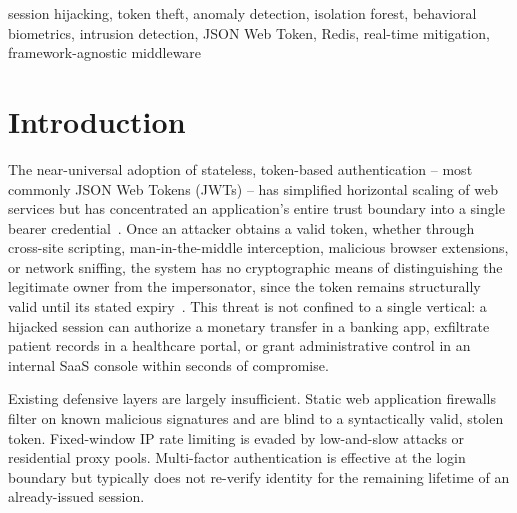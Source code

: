 \documentclass[conference]{IEEEtran}
\begin{document}
\begin{IEEEkeywords}
session hijacking, token theft, anomaly detection, isolation forest, behavioral biometrics, intrusion detection, JSON Web Token, Redis, real-time mitigation, framework-agnostic middleware
\end{IEEEkeywords}

\section{Introduction}
The near-universal adoption of stateless, token-based authentication -- most commonly JSON Web Tokens (JWTs) -- has simplified horizontal scaling of web services but has concentrated an application's entire trust boundary into a single bearer credential~\cite{jones2015jwt}. Once an attacker obtains a valid token, whether through cross-site scripting, man-in-the-middle interception, malicious browser extensions, or network sniffing, the system has no cryptographic means of distinguishing the legitimate owner from the impersonator, since the token remains structurally valid until its stated expiry~\cite{owasp2021top10}. This threat is not confined to a single vertical: a hijacked session can authorize a monetary transfer in a banking app, exfiltrate patient records in a healthcare portal, or grant administrative control in an internal SaaS console within seconds of compromise.

Existing defensive layers are largely insufficient. Static web application firewalls filter on known malicious signatures and are blind to a syntactically valid, stolen token. Fixed-window IP rate limiting is evaded by low-and-slow attacks or residential proxy pools. Multi-factor authentication is effective at the login boundary but typically does not re-verify identity for the remaining lifetime of an already-issued session.
\end{document}
